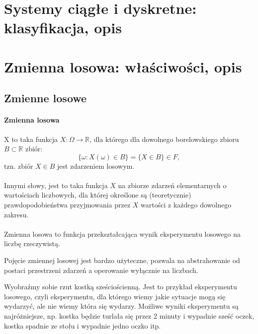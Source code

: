 \documentclass[]{report}
\begin{document}
\section{Systemy ciągłe i dyskretne: klasyfikacja, opis}
\section{Zmienna losowa: właściwości, opis}

\subsection{Zmienne losowe}

\paragraph{Zmienna losowa} X to taka funkcja $X : \Omega \longrightarrow \mathbb{R}$, dla którego dla dowolnego borelowskiego zbioru $B \subset \mathbb{R}$ zbiór:
\begin{equation}
\{\omega : X(\omega) \in B \} = \{X \in B\} \in F,
\end{equation}
tzn. zbiór $X \in B$ jest zdarzeniem losowym.\\\\
Innymi słowy, jest to taka funkcja $X$ na zbiorze zdarzeń elementarnych o wartościach liczbowych, dla której określone są (teoretycznie) prawdopodobieństwa przyjmowania przez $X$ wartości z każdego dowolnego zakresu.\\\\

Zmienna losowa to funkcja przekształcająca wynik eksperymentu losowego na liczbę rzeczywistą. 

Pojęcie zmiennej losowej jest bardzo użyteczne, pozwala na abstrahowanie od postaci przestrzeni zdarzeń a operowanie wyłącznie na liczbach. 

Wyobraźmy sobie rzut kostką sześciościenną. Jest to przykład eksperymentu losowego, czyli eksperymentu, dla którego wiemy jakie sytuacje mogą się wydarzyć, ale nie wiemy która się wydarzy. Możliwe wyniki eksperymentu są najróżniejsze, np. kostka będzie turlała się przez 2 minuty i wypadnie sześć oczek, kostka spadnie ze stołu i wypadnie jedno oczko itp. 
\end{document}
